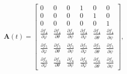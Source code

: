 \documentclass[pdflatex,sn-mathphys-num]{sn-jnl}%
\theoremstyle{thmstyleone}%
\theoremstyle{thmstyletwo}%
\theoremstyle{thmstylethree}%
\renewcommand{\vec}[1]{\boldsymbol{#1}}
\begin{document}
\setcounter{MaxMatrixCols}{12}
\begin{align}
\vec{A}(t)=
\begin{bmatrix}
0 & 0 & 0 & 1 & 0 & 0 \\
0 & 0 & 0 & 0 & 1 & 0 \\
0 & 0 & 0 & 0 & 0 & 1 \\
\frac{\partial f_4}{\partial \varphi} & \frac{\partial f_4}{\partial \theta} & \frac{\partial f_4}{\partial \psi} & \frac{\partial f_4}{\partial \dot{\varphi}} & \frac{\partial f_4}{\partial \dot{\theta}} & \frac{\partial f_4}{\partial \dot{\psi}} \\
\frac{\partial f_5}{\partial \varphi} & \frac{\partial f_5}{\partial \theta} & \frac{\partial f_5}{\partial \psi} & \frac{\partial f_5}{\partial \dot{\varphi}} & \frac{\partial f_5}{\partial \dot{\theta}} & \frac{\partial f_5}{\partial \dot{\psi}} \\
\frac{\partial f_6}{\partial \varphi} & \frac{\partial f_6}{\partial \theta} & \frac{\partial f_6}{\partial \psi} & \frac{\partial f_6}{\partial \dot{\varphi}} & \frac{\partial f_6}{\partial \dot{\theta}} & \frac{\partial f_6}{\partial \dot{\psi}}
\end{bmatrix},
\end{align}
\end{document}
